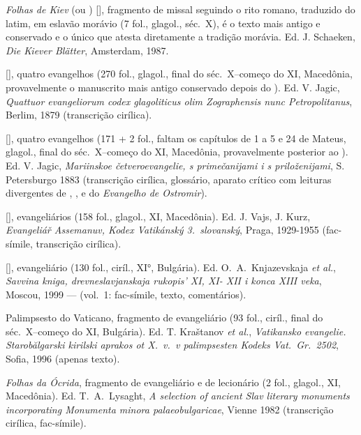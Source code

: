 \begin{compactitem}[--]
	\item \emph{Folhas de Kiev} (ou ) [],
	fragmento de missal seguindo o rito romano, traduzido do latim, em eslavão
	morávio (7 fol., glagol., séc.\ X),
	é o texto mais antigo e conservado e o único que atesta diretamente a
	tradição morávia. Ed. J. Schaeken, \emph{Die Kiever Blätter}, Amsterdam, 1987.
	\item {} [], quatro evangelhos (270 fol.,
	glagol., final do séc.\ X--começo do XI, Macedônia, provavelmente o manuscrito
	mais antigo conservado depois do
	). Ed. V. Jagic, \emph{Quattuor evangeliorum codex
		glagoliticus olim Zographensis nunc Petropolitanus}, Berlim, 1879
	(transcrição cirílica).
	\item {} [], quatro evangelhos (171 + 2 fol., faltam os
	capítulos de 1 a 5 e 24 de Mateus, glagol., final do séc.\ X--começo do
	XI, Macedônia, provavelmente posterior ao ). Ed. V. Jagic,
	\emph{Mariinskoe četveroevangelie, s primečanijami i s priloženijami}, S.
	Petersburgo 1883 (transcrição cirílica, glossário, aparato crítico com
	leituras divergentes de , ,  e do
	\emph{Evangelho de Ostromir}).
	\item {} [], evangeliários (158 fol., glagol.,
	XI, Macedônia). Ed. J. Vajs, J. Kurz, \emph{Evangeliář Assemanuv, Kodex
		Vatikánský 3.\ slovanský}, Praga, 1929-1955 (fac-símile, transcrição cirílica).
	\item {} [], evangeliário (130 fol., ciríl., XI°,
	Bulgária). Ed. O.~A.\ Knjazevskaja \emph{et al.}, \emph{Savvina kniga,
		drevneslavjanskaja rukopis’ XI, XI- XII i konca XIII veka}, Moscou, 1999 —
	(vol.\ 1: fac-símile, texto, comentários).
	\item Palimpsesto do Vaticano, fragmento de evangeliário (93 fol., ciríl.,
	final do séc.\ X--começo do XI, Bulgária). Ed. T. Kraštanov \emph{et al.},
	\emph{Vatikansko evangelie. Starobălgarski kirilski aprakos ot X.\ v.\ v
		palimpsesten Kodeks Vat.\ Gr.\ 2502}, Sofia, 1996 (apenas texto).
	\item \emph{Folhas da Ócrida}, fragmento de evangeliário e de lecionário (2
	fol., glagol., XI, Macedônia). Ed. T.~A.\ Lysaght, \emph{A selection of
		ancient Slav literary monuments incorporating Monumenta minora palaeobulgaricae}, Vienne 1982 (transcrição cirílica, fac-símile).

\end{compactitem}
